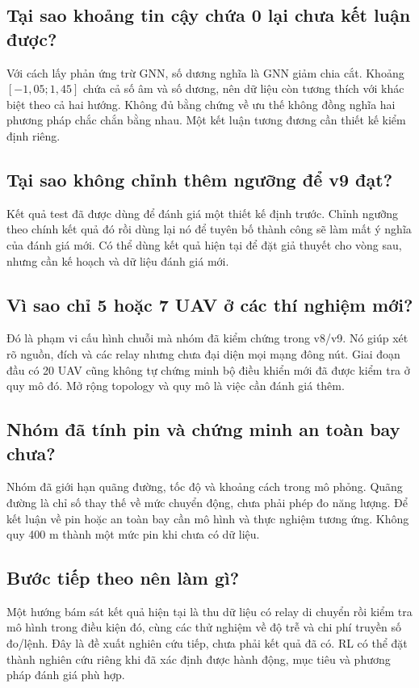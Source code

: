 \subsection*{Tại sao khoảng tin cậy chứa 0 lại chưa kết luận được?}
Với cách lấy phản ứng trừ GNN, số dương nghĩa là GNN giảm chia cắt. Khoảng $[-1,05;1,45]$ chứa cả số âm và số dương, nên dữ liệu còn tương thích với khác biệt theo cả hai hướng. Không đủ bằng chứng về ưu thế không đồng nghĩa hai phương pháp chắc chắn bằng nhau. Một kết luận tương đương cần thiết kế kiểm định riêng.

\subsection*{Tại sao không chỉnh thêm ngưỡng để v9 đạt?}
Kết quả test đã được dùng để đánh giá một thiết kế định trước. Chỉnh ngưỡng theo chính kết quả đó rồi dùng lại nó để tuyên bố thành công sẽ làm mất ý nghĩa của đánh giá mới. Có thể dùng kết quả hiện tại để đặt giả thuyết cho vòng sau, nhưng cần kế hoạch và dữ liệu đánh giá mới.

\subsection*{Vì sao chỉ 5 hoặc 7 UAV ở các thí nghiệm mới?}
Đó là phạm vi cấu hình chuỗi mà nhóm đã kiểm chứng trong v8/v9. Nó giúp xét rõ nguồn, đích và các relay nhưng chưa đại diện mọi mạng đông nút. Giai đoạn đầu có 20 UAV cũng không tự chứng minh bộ điều khiển mới đã được kiểm tra ở quy mô đó. Mở rộng topology và quy mô là việc cần đánh giá thêm.

\subsection*{Nhóm đã tính pin và chứng minh an toàn bay chưa?}
Nhóm đã giới hạn quãng đường, tốc độ và khoảng cách trong mô phỏng. Quãng đường là chỉ số thay thế về mức chuyển động, chưa phải phép đo năng lượng. Để kết luận về pin hoặc an toàn bay cần mô hình và thực nghiệm tương ứng. Không quy 400 m thành một mức pin khi chưa có dữ liệu.

\subsection*{Bước tiếp theo nên làm gì?}
Một hướng bám sát kết quả hiện tại là thu dữ liệu có relay di chuyển rồi kiểm tra mô hình trong điều kiện đó, cùng các thử nghiệm về độ trễ và chi phí truyền số đo/lệnh. Đây là đề xuất nghiên cứu tiếp, chưa phải kết quả đã có. RL có thể đặt thành nghiên cứu riêng khi đã xác định được hành động, mục tiêu và phương pháp đánh giá phù hợp.

